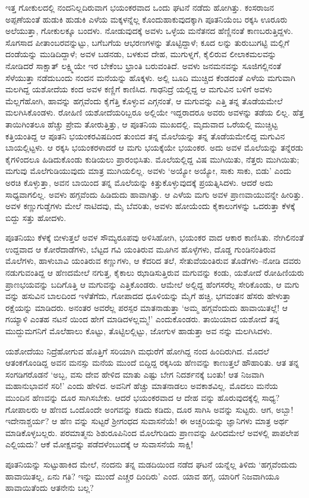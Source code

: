  ಇತ್ತ ಗೋಕುಲದಲ್ಲಿ ನಂದನಿಲ್ಲದಿರುವಾಗ ಭಯಂಕರವಾದ ಒಂದು ಘಟನೆ ನಡೆದು ಹೋಗಿತ್ತು. ಕಂಸರಾಜನ ಅಪ್ಪಣೆಯಂತೆ ಹುಡುಕಿ ಹುಡುಕಿ ಎಳೆಯ ಮಕ್ಕಳನ್ನೆಲ್ಲ ಕೊಂದುಹಾಕುವುದಕ್ಕಾಗಿ ಪೂತನಿಯೆಂಬ ರಕ್ಕಸಿ ಊರೂರು ಅಲೆಯುತ್ತಾ, ಗೋಕುಲಕ್ಕೂ ಬಂದಳು. ನೋಡುವುದಕ್ಕೆ ಅವಳು ಒಳ್ಳೆಯ ಮನೆತನದ ಹೆಣ್ಣಿನಂತೆ ಕಾಣಬರುತ್ತಿದ್ದಳು. ಸೊಗಸಾದ ಪೀತಾಂಬರವನ್ನುಟ್ಟು, ಬಗೆಬಗೆಯ ಆಭರಣಗಳನ್ನು ತೊಟ್ಟಿದ್ದಾಳೆ; ಕೂದ ಲನ್ನು ತುರುಬುಗಟ್ಟಿ ಮಲ್ಲಿಗೆ ದಂಡೆಯನ್ನು ಮುಡಿದಿದ್ದಾಳೆ; ಅವಳ ಬಡನಡು, ಬಳಕುವ ದೇಹ, ಮುಗುಳ್ನಗೆ, ಕೈಲಿರುವ ಲೀಲಾಕಮಲವನ್ನು ನೋಡಿದರೆ ಸಾಕ್ಷಾತ್ ಲಕ್ಷ್ಮಿಯೇ ಇರ ಬೇಕೆಂಬ ಭ್ರಾಂತಿ ಬರುವಂತಿದೆ. ಅವಳು ಜನಮನವನ್ನು ಸೂಜಿಗಲ್ಲಿನಂತೆ ಸೆಳೆಯುತ್ತಾ ನಡೆದುಬಂದು ನಂದನ ಮನೆಯನ್ನು ಹೊಕ್ಕಳು. ಅಲ್ಲಿ ಬೂದಿ ಮುಚ್ಚಿದ ಕೆಂಡದಂತೆ ಎಳೆಯ ಮಗುವಾಗಿ ಮಲಗಿದ್ದ ಯಶೋದೆಯ ಕಂದ ಅವಳ ಕಣ್ಣಿಗೆ ಕಾಣಿಸಿದ. ಗಾಢನಿದ್ರೆ ಯಲ್ಲಿದ್ದ ಆ ಮಗುವಿನ ಬಳಿಗೆ ಅವಳು ಮೆಲ್ಲಗೆಹೋಗಿ, ಹಾವನ್ನು ಹಗ್ಗವೆಂದು ಕೈಗೆತ್ತಿ ಕೊಳ್ಳುವ ಎಗ್ಗನಂತೆ, ಆ ಮಗುವನ್ನು ಎತ್ತಿ ತನ್ನ ತೊಡೆಯಮೇಲೆ ಮಲಗಿಸಿಕೊಂಡಳು. ರೋಹಿಣಿ ಯಶೋದೆಯರಿಬ್ಬರೂ ಅಲ್ಲಿಯೇ ಇದ್ದರಾದರೂ ಅವರು ಅವಳನ್ನು ತಡೆಯ ಲಿಲ್ಲ. ಹೆತ್ತ ತಾಯಿಗಿಂತಲೂ ಹೆಚ್ಚು ಪ್ರೇಮ ತೋರುತ್ತಿತ್ತು, ಆ ಪೂತನಿಯ ಮುಖದಲ್ಲಿ. ಮೃದುವಾದ ಒರೆಯಲ್ಲಿ ಮುಚ್ಚಿಟ್ಟ ಕತ್ತಿಯಂತಿದ್ದ ಆ ಪೂತನಿ ಭಯಂಕರವಿಷದಿಂದ ತುಂಬಿದ ತನ್ನ ಮೊಲೆಯನ್ನು ತನ್ನ ತೊಡೆಯಮೇಲಿದ್ದ ಮಗುವಿನ ಬಾಯಲ್ಲಿಟ್ಟಳು. ಆ ರಕ್ಕಸಿ ಭಯಂಕರಳಾದರೆ ಆ ಮಗು ಭಯಕ್ಕೆಯೇ ಭಯಂಕರ. ಅದು ಅವಳ ಮೊಲೆಯನ್ನು ತನ್ನೆರಡು ಕೈಗಳಿಂದಲೂ ಹಿಡಿದುಕೊಂಡು ಕುಡಿಯಲು ಪ್ರಾರಂಭಿಸಿತು. ಮೊಲೆಯಲ್ಲಿದ್ದ ವಿಷ ಮುಗಿಯಿತು, ನೆತ್ತರು ಮುಗಿಯಿತು; ಮಗುವು ಮೊಲೆಗುಡಿಯುವುದು ಮಾತ್ರ ಮುಗಿಯಲಿಲ್ಲ. ಅವಳು ‘ಅಯ್ಯೋ ಅಯ್ಯೋ, ಸಾಕು ಸಾಕು, ಬಿಡು’ ಎಂದು ಅರಚಿ ಕೊಳ್ಳುತ್ತಾ, ಅವನ ಬಾಯಿಂದ ತನ್ನ ಮೊಲೆಯನ್ನು ಕಿತ್ತುಕೊಳ್ಳುವುದಕ್ಕೆ ಪ್ರಯತ್ನಿಸಿದಳು. ಆದರೆ ಅದು ಸಾಧ್ಯವಾಗಲಿಲ್ಲ. ಅವಳು ಹಗ್ಗವೆಂದು ಹಿಡಿದುದು ಹಾವಾಗಿತ್ತು. ಆ ಎಳೆಯ ಮಗು ಅವಳ ಪ್ರಾಣವಾಯುವನ್ನೇ ಹೀರಿತ್ತು. ಅವಳ ಕಣ್ಣುಗುಡ್ಡೆಗಳು ಮೇಲೆ ನಾಟಿದವು, ಮೈ ಬೆವರಿತು, ಅವಳು ಹೋಯೆಂದು ಕೈಕಾಲುಗಳನ್ನು ಒದರುತ್ತಾ ಕೆಳಕ್ಕೆ ಬಿದ್ದು ಸತ್ತು ಹೋದಳು.

ಪೂತನಿಯು ಕೆಳಕ್ಕೆ ಬೀಳುತ್ತಲೆ ಅವಳ ಸೌಮ್ಯರೂಪವು ಅಳಿಸಿಹೋಗಿ, ಭಯಂಕರ ವಾದ ಆಕಾರ ಕಾಣಿಸಿತು. ನೇಗಿಲಿನಂತೆ ಉದ್ದವಾದ ಆ ಕೋರೆದಾಡೆಗಳು, ಬೆಟ್ಟದ ಗವಿ ಯಂತಿರುವ ಮೂಗಿನ ಹೊಳ್ಳೆಗಳು, ದೊಡ್ಡ ಗುಂಡಿನಂತಿರುವ ಮೊಲೆಗಳು, ಹಾಳುಬಾವಿ ಯಂತಿರುವ ಕಣ್ಣುಗಳು, ಆ ಕೆದರಿದ ತಲೆ, ಸೇತುವೆಯಂತಿರುವ ತೊಡೆಗಳು–ನೋಡಿ ದವರು ನಡುಗುವಂತಿದ್ದ ಆ ಹೆಣದಮೇಲೆ ನಗುತ್ತ, ಕೈಕಾಲು ಝಾಡಿಸುತ್ತಿರುವ ಮಗುವನ್ನು ಕಂಡು, ಯಶೋದೆ ರೋಹಿಣಿಯರು ಪ್ರಾಣಭಯವನ್ನು ಬದಿಗೊತ್ತಿ ಆ ಮಗುವನ್ನು ಎತ್ತಿಕೊಂಡರು. ಆಮೇಲೆ ಅಲ್ಲಿದ್ದ ಹೆಂಗಸರೆಲ್ಲ ಸೇರಿಕೊಂಡು, ಆ ಮಗು ವನ್ನು ಹಸುವಿನ ಬಾಲದಿಂದ ಇಳೆತೆಗೆದು, ಗೋಪಾದದ ಧೂಳಿಯನ್ನು ಮೈಗೆ ಹಚ್ಚಿ, ಭಗವಂತನ ಹೆಸರು ಹೇಳುತ್ತಾ ರಕ್ಷೆಯನ್ನು ಮಾಡಿದರು. ಅನಂತರ ಅವರೆಲ್ಲ ಪರಸ್ಪರ ಮಾತನಾಡುತ್ತಾ ‘ಅಮ್ಮ ಹಗ್ಗವೆಂದುದು ಹಾವಾಯಿತಲ್ಲೆ! ಆ ಗಯ್ಯಾಳಿ ಎಂತಹ ನಟನೆ ಯಿಂದ ಹೇಗೆ ಮಾಡಿದಳಲ್ಲಮ್ಮ!’ ಎಂದುಕೊಂಡರು. ತಾಯಿಯಾದ ಯಶೋದೆ ತನ್ನ ಮುದ್ದುಮಗನಿಗೆ ಮೊಲೆಹಾಲು ಕೊಟ್ಟು, ತೊಟ್ಟಿಲಲ್ಲಿಟ್ಟು, ಜೋಗುಳ ಹಾಡುತ್ತಾ ಅವ ನನ್ನು ಮಲಗಿಸಿದಳು.

ಯಶೋದೆಯು ನಿದ್ರೆಹೋಗುವ ಹೊತ್ತಿಗೆ ಸರಿಯಾಗಿ ಮಧುರೆಗೆ ಹೋಗಿದ್ದ ನಂದ ಹಿಂದಿರುಗಿದ. ಮೊದಲೆ ಆತಂಕಗೊಂಡಿದ್ದ ಅವನ ಮನಸ್ಸು ಮನೆಯ ಮುಂದೆ ಬಿದ್ದಿದ್ದ ರಕ್ಕಸಿಯ ಹೆಣವನ್ನು ಕಾಣುತ್ತಲೆ ಹೌಹಾರಿತು. ಆತ ತನ್ನ ಸಂಗಡಿಗರೊಡನೆ ‘ಅಬ್ಬ, ವಸು ದೇವ ಹೇಳಿದ ಮಾತು ಎಷ್ಟು ಬೇಗ ನಿದರ್ಶನಕ್ಕೆ ಬಂತು! ಆತ ನಿಜವಾಗಿ ಮಹಾನುಭಾವನೆ ಸರಿ!’ ಎಂದು ಹೇಳಿದ. ಅವನಿಗೆ ಹೆಚ್ಚು ಮಾತನಾಡಲು ಅವಕಾಶವಿಲ್ಲ. ಮೊದಲು ಮನೆಯ ಮುಂದಿನ ಹೆಣವನ್ನು ದೂರ ಸಾಗಿಸಬೇಕು. ಆದರೆ ಭಯಂಕರವಾದ ಆ ದೇಹ ವನ್ನು ಹೊರುವುದಕ್ಕೆಲ್ಲಿ ಸಾಧ್ಯ? ಗೋಪಾಲರು ಆ ಹೆಣದ ಒಂದೊಂದೇ ಅಂಗವನ್ನು ಕಡಿದು ಕಡಿದು, ದೂರ ಸಾಗಿಸಿ ಅವನ್ನು ಸುಟ್ಟರು. ಆಗ, ಅಬ್ಬಾ! ಇದೇನಾಶ್ಚರ್ಯ? ಆ ಹೆಣ ವನ್ನು ಸುಟ್ಟರೆ ಶ್ರೀಗಂಧದ ಸುವಾಸನೆಯೆ! ಈ ಅಚ್ಚರಿಯನ್ನು ಜ್ಞಾನಿಗಳು ಮಾತ್ರ ಅರ್ಥ ಮಾಡಿಕೊಳ್ಳಬಲ್ಲರು. ಪರಮಾತ್ಮನು ಶಿಶುರೂಪಿನಿಂದ ಮೊಲೆಗುಡಿದು ಪ್ರಾಣವನ್ನು ಹೀರಿದಮೇಲೆ ಅವಳಲ್ಲಿ ಪಾಪಲೇಪ ಎಲ್ಲಿಯದು? ಆಕೆ ಮೋಕ್ಷವನ್ನು ಪಡೆದಳೆಂಬುದಕ್ಕೆ ಆ ಸುವಾಸನೆಯೆ ಸಾಕ್ಷಿ!

ಪೂತನಿಯನ್ನು ಸುಟ್ಟುಹಾಕಿದ ಮೇಲೆ, ನಂದನು ತನ್ನ ಮಡದಿಯಿಂದ ನಡೆದ ಘಟನೆ ಯನ್ನೆಲ್ಲ ತಿಳಿದು ‘ಹಗ್ಗವೆಂದುದು ಹಾವಾಯಿತಲ್ಲ, ಏನು ಗತಿ? ಇನ್ನು ಮುಂದೆ ಎಚ್ಚರ ದಿಂದಿರು’ ಎಂದ. ಯಾವ ಹಗ್ಗ, ಯಾರಿಗೆ ನಿಜವಾಗಿಯೂ ಹಾವಾಯಿತೆಂದು ಆತನೇನು ಬಲ್ಲ?

